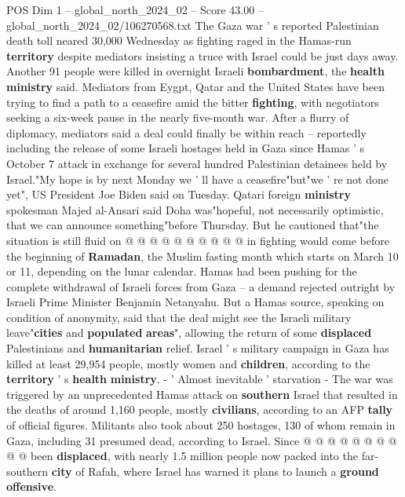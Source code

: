 \begin{textsample}{POS Dim 1 – global\_north\_2024\_02 – Score 43.00 – global\_north\_2024\_02/106270568.txt}  \label{ex:f1_pos_096}
The Gaza war ' s reported Palestinian death toll neared 30,000 Wednesday as fighting raged in the Hamas-run \textbf{territory} despite mediators insisting a truce with Israel could be just days away.
Another 91 people were killed in overnight Israeli \textbf{bombardment}, the \textbf{health} \textbf{ministry} said.
Mediators from Eygpt, Qatar and the United States have been trying to find a path to a ceasefire amid the bitter \textbf{fighting}, with negotiators seeking a six-week pause in the nearly five-month war.
After a flurry of diplomacy, mediators said a deal could finally be within reach -- reportedly including the release of some Israeli hostages held in Gaza since Hamas ' s October 7 attack in exchange for several hundred Palestinian detainees held by Israel."My hope is by next Monday we ' ll have a ceasefire"but"we ' re not done yet", US President Joe Biden said on Tuesday.
Qatari foreign \textbf{ministry} spokesman Majed al-Ansari said Doha was"hopeful, not necessarily optimistic, that we can announce something"before Thursday.
But he cautioned that"the situation is still fluid on @ @ @ @ @ @ @ @ @ @ in fighting would come before the beginning of \textbf{Ramadan}, the Muslim fasting month which starts on March 10 or 11, depending on the lunar calendar.
Hamas had been pushing for the complete withdrawal of Israeli forces from Gaza -- a demand rejected outright by Israeli Prime Minister Benjamin Netanyahu.
But a Hamas source, speaking on condition of anonymity, said that the deal might see the Israeli military leave"\textbf{cities} and \textbf{populated} \textbf{areas}", allowing the return of some \textbf{displaced} Palestinians and \textbf{humanitarian} relief.
Israel ' s military campaign in Gaza has killed at least 29,954 people, mostly women and \textbf{children}, according to the \textbf{territory} ' s \textbf{health} \textbf{ministry}. - ' Almost inevitable ' starvation - The war was triggered by an unprecedented Hamas attack on \textbf{southern} Israel that resulted in the deaths of around 1,160 people, mostly \textbf{civilians}, according to an AFP \textbf{tally} of official figures.
Militants also took about 250 hostages, 130 of whom remain in Gaza, including 31 presumed dead, according to Israel.
Since @ @ @ @ @ @ @ @ @ @ been \textbf{displaced}, with nearly 1.5 million people now packed into the far-southern \textbf{city} of Rafah, where Israel has warned it plans to launch a \textbf{ground} \textbf{offensive}.

\end{textsample}
